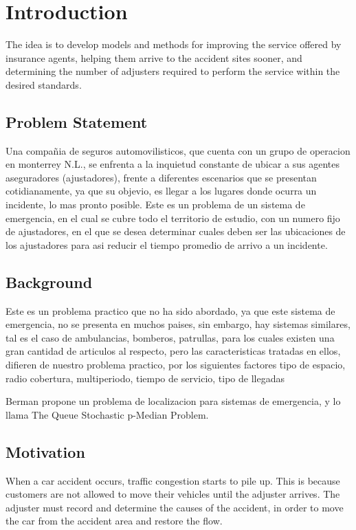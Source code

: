 \chapter{Introduction}

The idea is to develop models and methods
for improving the service offered by insurance agents,
helping them arrive to the accident sites sooner,
and determining the number of adjusters required
to perform the service within the desired standards.

\section{Problem Statement}
Una compañia de seguros automovilisticos,
que cuenta con un grupo de operacion en monterrey N.L.,
se enfrenta a la inquietud constante de
ubicar a sus agentes aseguradores (ajustadores),
frente a diferentes escenarios que se presentan cotidianamente,
ya que su objevio,
es llegar a los lugares donde ocurra un incidente,
lo mas pronto posible.
Este es un problema de un sistema de emergencia,
en el cual se cubre todo el territorio de estudio,
con un numero fijo de ajustadores,
en el que se desea determinar
cuales deben ser las ubicaciones de los ajustadores
para asi reducir el tiempo promedio de arrivo a un incidente.

\section{Background}
Este es un problema practico que no ha sido abordado,
ya que este sistema de emergencia,
no se presenta en muchos paises,
sin embargo, hay sistemas similares,
tal es el caso de ambulancias, bomberos, patrullas,
para los cuales existen una gran cantidad de articulos al respecto,
pero las caracteristicas tratadas en ellos,
difieren de nuestro problema practico,
por los siguientes factores
tipo de espacio,
radio cobertura,
multiperiodo,
tiempo de servicio,
tipo de llegadas

Berman propone un problema de localizacion para sistemas de emergencia,
y lo llama The Queue Stochastic p-Median Problem.

\section{Motivation}
When a car accident occurs,
traffic congestion starts to pile up.
This is because
customers are not allowed to move their vehicles until the adjuster arrives.
The adjuster must record and determine the causes of the accident,
in order to move the car from the accident area
and restore the flow.

